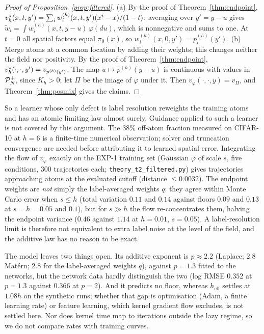 \documentclass{article}
\theoremstyle{plain}
\theoremstyle{remark}
\begin{document}
\begin{proof}[Proof of Proposition~\ref{prop:filtered}]
(a) By the proof of Theorem~\ref{thm:endpoint},
$v_h^\star(x,t,y')=\sum_iw_i^{(h)}(x,t,y')(x^i-x)/(1-t)$; averaging over $y'=y-u$ gives
$\tilde w_i=\int w_i^{(h)}(x,t,y-u)\,\varphi(du)$, which is nonnegative and sums to one. At
$t=0$ all spatial factors equal $\pi_0(x)$, so $w_i^{(h)}(x,0,y')=p_i^{(h)}(y')$.
(b) Merge atoms at a common location by adding their weights; this changes neither the field
nor positivity. By the proof of Theorem~\ref{thm:endpoint}, $v_h^\star(\cdot,\cdot,y')=v_{p^{(h)}(y')}$.
The map $u\mapsto p^{(h)}(y-u)$ is continuous with values in $\mathcal{P}_N^{+}$, since $K_h>0$; let $\Pi$
be the image of $\varphi$ under it. Then $v_\varphi(\cdot,\cdot,y)=v_\Pi$, and
Theorem~\ref{thm:posmix} gives the claims.
\end{proof}

So a learner whose only defect is label resolution reweights the training atoms and
has an atomic limiting law almost surely. Guidance applied to such a learner is not covered by this argument. The $38\%$ off-atom fraction measured on
CIFAR-10 at $h{=}6$ is a finite-time numerical observation; solver and truncation
convergence are needed before attributing it to learned spatial error. Integrating the flow of $v_\varphi$ exactly
on the EXP-1 training set (Gaussian $\varphi$ of scale $s$, five conditions, 300
trajectories each; \texttt{theory\_t2\_filtered.py}) gives trajectories approaching atoms at the evaluated cutoff (distance $\le0.0032$). The endpoint weights are \emph{not} simply the label-averaged
weights $q$: they agree within Monte Carlo error when $s\le h$ (total variation $0.11$
and $0.14$ against floors $0.09$ and $0.13$ at $s=h=0.05$ and $0.1$), but for $s\gg h$
the flow re-concentrates them, halving the endpoint variance ($0.46$ against $1.14$ at
$h=0.01$, $s=0.05$). A label-resolution limit is therefore not equivalent to extra label
noise at the level of the field, and the additive law has no reason to be exact.

The model leaves two things open. Its additive exponent is $p\approx2.2$ (Laplace; $2.8$
Mat\'ern; $2.8$ for the label-averaged weights $q$), against $p=1.3$ fitted to the networks, but the network data hardly
distinguish the two (log RMSE $0.352$ at $p=1.3$ against $0.366$ at $p=2$). And it
predicts no floor, whereas $h_{\mathrm{eff}}$ settles at $1.08h$ on the synthetic runs;
whether that gap is optimisation (Adam, a finite learning rate) or feature learning,
which kernel gradient flow excludes, is not settled here. Nor does kernel time map to
iterations outside the lazy regime, so we do not compare rates with training curves.
\end{document}
